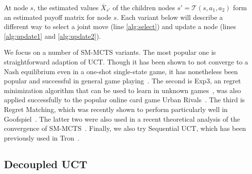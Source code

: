 \documentclass[conference]{IEEEtran}
\newcommand{\cA}{\mathcal{A}}
\newcommand{\cT}{\mathcal{T}}
\begin{document}
At node $s$, the estimated values $\bar{X}_{s'}$ of the children nodes $s' = \cT(s,a_1,a_2)$ 
form an estimated payoff matrix for node $s$. 
Each variant below will describe a different way to select a joint 
move (line \ref{alg:select}) and update a node (lines \ref{alg:update1} and \ref{alg:update2}). 


We focus on a number of SM-MCTS variants. The most popular one is straightforward adaption of UCT. 
Though it has been shown to not converge to a Nash equilibrium even in a one-shot single-state 
game, it has nonetheless been popular and successful in general game playing~\cite{Shafiei09}. 
The second is Exp3, an regret minimization algorithm that can be used to learn in unknown
games~\cite{Exp3}, was also applied successfully to the popular online card game Urban Rivals~\cite{Teytaud11Upper,StPierre12Online}. 
The third is Regret Matching, which was recently shown to perform particularly well in Goofspiel~\cite{Lanctot13Goofspiel}.
The latter two were also used in a recent theoretical analysis of the convergence of SM-MCTS~\cite{Lisy13Computing}.
Finally, we also try Sequential UCT, which has been previously used in Tron~\cite{Samothrakis10Tron,Lanctot13Tron}.

\subsection{Decoupled UCT} 
\end{document}
